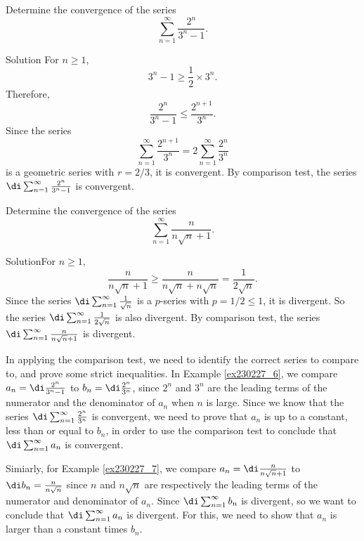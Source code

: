 \begin{example}[label=ex230227_6]{}
Determine the convergence of the series 
\[\sum_{n=1}^{\infty}\frac{2^n}{3^n-1}.\]

\end{example}
\begin{solution}{Solution}
For $n\geq 1$, 
\[3^n-1\geq \frac{1}{2}\times 3^n.\]
Therefore,
\[\frac{2^n}{3^n-1}\leq   \frac{2^{n+1 }}{3^n}.\]Since the series \[\sum_{n=1}^{\infty}\frac{2^{n+1}}{3^n}=2\sum_{n=1}^{\infty}\frac{2^{n}}{3^n}\] is a geometric series with $r=2/3$, it is convergent. By comparison test, the series $\di\sum_{n=1}^{\infty}\frac{2^n}{3^n-1}$ is convergent.
\end{solution}

\begin{example}[label=ex230227_7]{}
Determine the convergence of the series 
\[\sum_{n=1}^{\infty}\frac{n}{n\sqrt{n}+1}.\]

\end{example}
\begin{solution}{Solution}For $n\geq 1$,\[
\frac{n}{n\sqrt{n}+1}\geq\frac{n}{n\sqrt{n}+n\sqrt{n}}=\frac{1}{2 \sqrt{n}}.\]
Since the series $\di\sum_{n=1}^{\infty}\frac{1}{\sqrt{n}}$ is a $p$-series with $p=1/2\leq 1$, it is divergent. So   the series $\di\sum_{n=1}^{\infty}\frac{1}{2\sqrt{n}}$ is also divergent. By comparison test, the series
$\di \sum_{n=1}^{\infty}\frac{n}{n\sqrt{n}+1}$ is divergent.
\end{solution}

In applying the comparison test, we need to identify the correct series to compare to, and prove some strict inequalities. In Example \ref{ex230227_6}, we compare  $a_n=\di \frac{2^n}{3^n-1}$ to $b_n=\di \frac{2^n}{3^n}$, since $2^n$ and $3^n$ are the leading terms of the numerator and the denominator of $a_n$ when $n$ is large. Since we know that the series $\di\sum_{n=1}^{\infty}\frac{2^n}{3^n}$ is convergent, we need to prove that $a_n $ is up to a constant, less than or equal to $b_n$, in order to use the comparison test to conclude that $\di\sum_{n=1}^{\infty}a_n$ is convergent.

Simiarly, for Example \ref{ex230227_7}, we compare  $a_n=\di\frac{n}{n\sqrt{n}+1}$ to $\di b_n=\frac{n}{n\sqrt{n}}$ since $n$ and $n\sqrt{n}$ are respectively the leading terms of the numerator and denominator of $a_n$. Since $\di\sum_{n=1}^{\infty}b_n$ is divergent, so we want to conclude that $\di\sum_{n=1}^{\infty}a_n$ is divergent. For this, we need to show that $a_n$ is larger than a constant times $b_n$.

